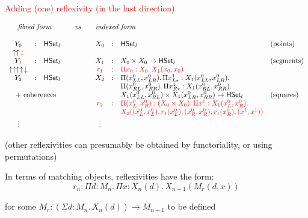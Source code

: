\documentclass[12pt,landscape]{article}
\begin{document}
\begin{LARGE}
\begin{sf}
\newpage

\begin{center}
\textcolor{red}{\huge Adding (one) reflexivity (in the last direction)}
\end{center}

\newcommand{\rouge}[1]{\textcolor{red}{#1}}
\newcommand{\bleu}[1]{\textcolor{blue}{#1}}

$$
\begin{array}{cllccllll}
\multicolumn{3}{c}{\mbox{\emph{fibred form}}} & \quad\mathit{vs}\quad & \multicolumn{3}{l}{\mbox{\emph{indexed form}}} \\
\\
Y_0 &:& \HSet_l & & X_0 & : & \HSet_l & \mbox{(points)}\\
\uparrow\uparrow\!\rouge{\downarrow} \\
Y_1 &:& \HSet_l & & X_1 & : & X_0 \times X_0 \rightarrow \HSet_l & \mbox{(segments)}\\
\uparrow\uparrow\uparrow\uparrow\!\rouge{\downarrow} &&&& \rouge{r_1} & : & \rouge{\Pi x_0:X_0.\,X_1(x_0,x_0)}\\
Y_2 &:& \HSet_l & & X_2 & : & \Pi (x^0_{LL},x^0_{LR}).\, \Pi x^1_{L*}:X_1 (x^0_{LL},x^0_{LR}).\\
& & & & & & \Pi (x^0_{RL},x^0_{RR}).\, \Pi x^1_{R*}:X_1 (x^0_{RL},x^0_{RR}).\, \\
\multicolumn{3}{c}{\mbox{~+ coherences}} & & & & X_1 (x^0_{LL},x^0_{RL}) \times X_1 (x^0_{LR},x^0_{RR}) \rightarrow \HSet_l \qquad & \mbox{(squares)}\\
&&&& \rouge{r_2} & : & \rouge{\Pi (x^0_{L},x^0_{R}):(X_0 \times X_0).\,\Pi x^1:X_1(x^0_L,x^0_R).}\,\\
& & & & & & \rouge{X_2((x^0_{L},x^0_{L}),r_1(x^0_{L}),(x^0_{R},x^0_{R}),r_1(x^0_{R}),(x^1,x^1))}\\
\vdots & & & & \vdots\\
\end{array}
$$

(other reflexivities can presumably be obtained by functoriality, or using permutations)

\bigskip

In terms of matching objects, reflexivities have the form:
$$r_n: \Pi d:M_n.\,\Pi x:X_n(d).\, X_{n+1}(M_r(d,x))$$

for some $M_r : (\Sigma d:M_n.\,X_n(d)) \rightarrow M_{n+1}$ to be defined

\newpage


\end{sf}
\end{LARGE}
\end{document}
